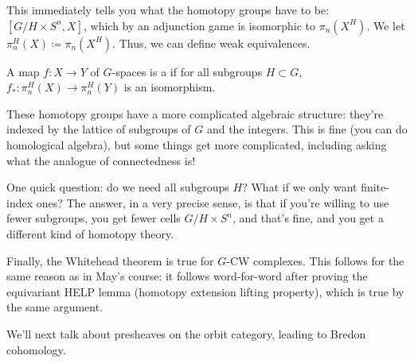 This immediately tells you what the homotopy groups have to be: $[G/H\times S^n, X]$, which by an adjunction game
is isomorphic to $\pi_n(X^H)$. We let $\pi_n^H(X)\coloneqq \pi_n(X^H)$. Thus, we can define weak equivalences.
\begin{defn}
A map $f\colon X\to Y$ of $G$-spaces is a  if for all subgroups $H\subset G$,
$f_*\colon\pi_n^H(X)\to\pi_n^H(Y)$ is an isomorphism.
\end{defn}
These homotopy groups have a more complicated algebraic structure: they're indexed by the lattice of subgroups of
$G$ and the integers. This is fine (you can do homological algebra), but some things get more complicated,
including asking what the analogue of connectedness is!

One quick question: do we need all subgroups $H$? What if we only want finite-index ones? The answer, in a very
precise sense, is that if you're willing to use fewer subgroups, you get fewer cells $G/H\times S^n$, and that's
fine, and you get a different kind of homotopy theory.

Finally, the Whitehead theorem is true for $G$-CW complexes. This follows for the same reason as in May's course:
it follows word-for-word after proving the equivariant HELP lemma (homotopy extension lifting property), which is
true by the same argument.

We'll next talk about presheaves on the orbit category, leading to Bredon cohomology.
